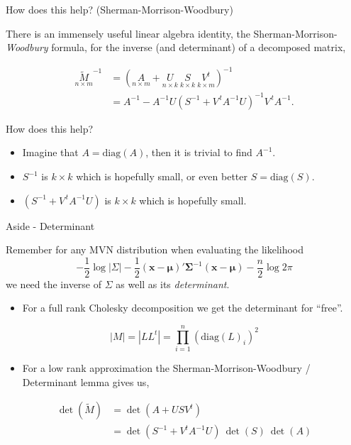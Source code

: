\documentclass[11pt,ignorenonframetext,]{beamer}
\providecommand{\tightlist}{%
  \setlength{\itemsep}{0pt}\setlength{\parskip}{0pt}}
\begin{document}
\begin{frame}[t]{How does this help? (Sherman-Morrison-Woodbury)}

There is an immensely useful linear algebra identity, the
Sherman-Morrison-\emph{Woodbury} formula, for the inverse (and
determinant) of a decomposed matrix,

\[\begin{aligned}
\underset{n \times m}{\tilde M}^{-1} 
&= \left(\underset{n \times m}{A} + \underset{n \times k}{U} ~ \underset{k \times k}{S} ~ \underset{k \times m}{V^t}\right)^{-1} \\
&= A^{-1} - A^{-1} U \left(S^{-1}+V^{\,t} A^{-1} U\right)^{-1}V^{\,t} A^{-1}.
\end{aligned}\]

\pause

How does this help?

\begin{itemize}
\item
  Imagine that \(A = \text{diag}(A)\), then it is trivial to find
  \(A^{-1}\).
\item
  \(S^{-1}\) is \(k \times k\) which is hopefully small, or even better
  \(S = \text{diag}(S)\).
\item
  \(\left(S^{-1}+V^{\,t} A^{-1} U\right)\) is \(k \times k\) which is
  hopefully small.
\end{itemize}

\end{frame}

\begin{frame}{Aside - Determinant}

Remember for any MVN distribution when evaluating the likelihood
\[ -\frac{1}{2} \log {|\Sigma|} - \frac{1}{2} (\bm{x}-\bm{\mu})' {\bm{\Sigma}^{-1}} (\bm{x}-\bm{\mu}) - \frac{n}{2}\log 2\pi\]
we need the inverse of \(\Sigma\) as well as its \emph{determinant}.

\pause

\begin{itemize}
\tightlist
\item
  For a full rank Cholesky decomposition we get the determinant for
  ``free''.
\end{itemize}

\vspace{-3mm}

\[|M| = |LL^t| = \prod_{i=1}^n \left(\text{diag}(L)_i\right)^2\]

\pause

\begin{itemize}
\tightlist
\item
  For a low rank approximation the Sherman-Morrison-Woodbury /
  Determinant lemma gives us,
\end{itemize}

\vspace{-3mm}

\[\begin{aligned}
\det(\tilde M) 
  &= \det({A} + {U} {S} {V^t}) \\
  &= \det(S^{-1} + V^t A^{-1} U) ~ \det(S) ~ \det(A)
\end{aligned}\]

\end{frame}
\end{document}
